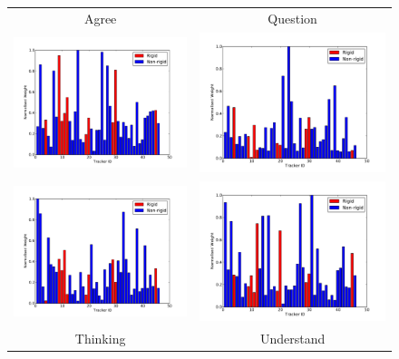 \begin{figure}[tb]
\centering
\begin{tabular}{ cc }
Agree & Question \\
\includegraphics[width = 0.49 \columnwidth]{featureselection/baragree.pdf} &
\includegraphics[width = 0.49 \columnwidth]{featureselection/barquestion.pdf} \\
\includegraphics[width = 0.49 \columnwidth]{featureselection/barthinking.pdf} & 
\includegraphics[width = 0.49 \columnwidth]{featureselection/barunderstand.pdf}\\
Thinking & Understand \\

\end{tabular}
\end{figure}
